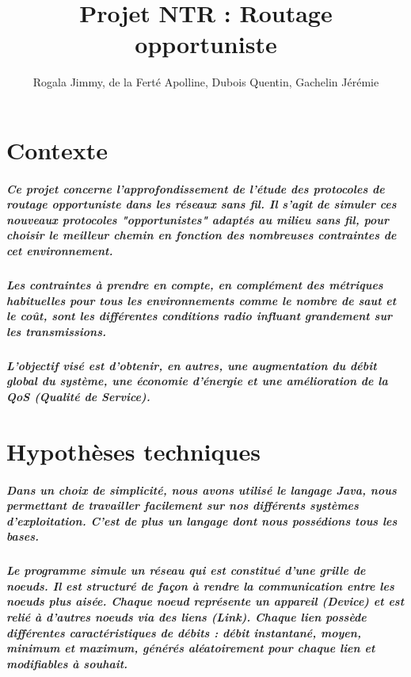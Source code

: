 \documentclass{report}
\title{Projet NTR : Routage opportuniste}
\author{Rogala Jimmy, de la Ferté Apolline, Dubois Quentin, Gachelin Jérémie}
\date{}
\begin{document}
\maketitle
\tableofcontents

\chapter{Contexte}

\paragraph{Ce projet concerne l'approfondissement de l'étude des protocoles de 
routage opportuniste dans les réseaux sans fil. Il s'agit de simuler ces nouveaux protocoles "opportunistes" adaptés au milieu sans fil, pour choisir le meilleur chemin en fonction des nombreuses contraintes de cet environnement.}

\paragraph{Les contraintes à prendre en compte, en complément des métriques habituelles pour tous les environnements comme le nombre de saut et le coût, sont les différentes conditions radio influant grandement sur les transmissions.}

\paragraph{L'objectif visé est d'obtenir, en autres, une augmentation du débit global du système, une économie d'énergie et une amélioration de la QoS (Qualité de Service).}

\chapter{Hypothèses techniques}

\paragraph{Dans un choix de simplicité, nous avons utilisé le langage Java, nous permettant de travailler facilement sur nos différents systèmes d'exploitation. C'est de plus un langage dont nous possédions tous les bases.}

\paragraph{Le programme simule un réseau qui est constitué d'une grille de noeuds. Il est structuré de façon à rendre la communication entre les noeuds plus aisée. Chaque noeud représente un appareil (Device) et est relié à d'autres noeuds via des liens (Link). Chaque lien possède différentes caractéristiques de débits : débit instantané, moyen, minimum et maximum, générés aléatoirement pour chaque lien et modifiables à souhait.}
\end{document}
